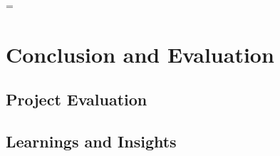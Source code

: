 \documentclass[conference]{IEEEtran}
\begin{document}
=

\section{Conclusion and Evaluation}
\subsection{Project Evaluation}

\subsection{Learnings and Insights}



\begin{thebibliography}{00}

\end{thebibliography}
\end{document}
